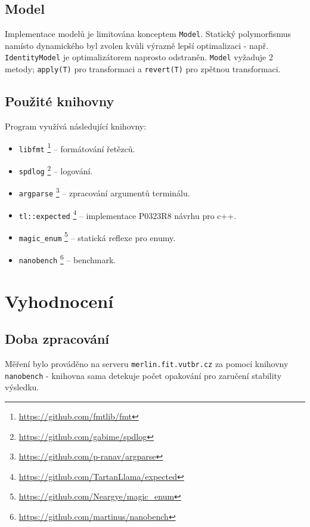 \documentclass[12pt,a4paper,titlepage,final]{report}
\begin{document}
\subsection{Model}
Implementace modelů je limitována konceptem \texttt{Model}. Statický polymorfismus namísto dynamického byl zvolen kvůli výrazně lepší optimalizaci - např. \texttt{IdentityModel} je optimalizátorem naprosto odstraněn. \texttt{Model} vyžaduje 2 metody; \texttt{apply(T)} pro transformaci a \texttt{revert(T)} pro zpětnou transformaci.

\subsection{Použité knihovny}
Program využívá následující knihovny:
\begin{itemize}
    \item \texttt{libfmt} \footnote{\url{https://github.com/fmtlib/fmt}} -- formátování řetězců.
    \item \texttt{spdlog} \footnote{\url{https://github.com/gabime/spdlog}} -- logování.
    \item \texttt{argparse} \footnote{\url{https://github.com/p-ranav/argparse}} -- zpracování argumentů terminálu.
    \item \texttt{tl::expected} \footnote{\url{https://github.com/TartanLlama/expected}} -- implementace P0323R8 návrhu pro c++.
    \item \texttt{magic\_enum} \footnote{\url{https://github.com/Neargye/magic_enum}} -- statická reflexe pro enumy.
    \item \texttt{nanobench} \footnote{\url{https://github.com/martinus/nanobench}} -- benchmark.
\end{itemize}

\section{Vyhodnocení}

\subsection{Doba zpracování}
Měření bylo prováděno na serveru \texttt{merlin.fit.vutbr.cz} za pomocí knihovny \texttt{nanobench} - knihovna sama detekuje počet opakování pro zaručení stability výsledku.
\end{document}
